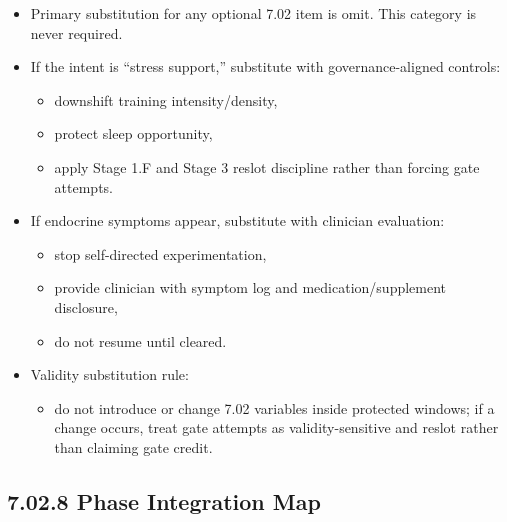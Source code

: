 \documentclass[10pt]{article}
\begin{document}
\begin{itemize}
\item Primary substitution for any optional 7.02 item is omit. This category is never required.
\item If the intent is “stress support,” substitute with governance-aligned controls:
  \begin{itemize}
  \item downshift training intensity/density,
  \item protect sleep opportunity,
  \item apply Stage 1.F and Stage 3 reslot discipline rather than forcing gate attempts.
  \end{itemize}
\item If endocrine symptoms appear, substitute with clinician evaluation:
  \begin{itemize}
  \item stop self-directed experimentation,
  \item provide clinician with symptom log and medication/supplement disclosure,
  \item do not resume until cleared.
  \end{itemize}
\item Validity substitution rule:
  \begin{itemize}
  \item do not introduce or change 7.02 variables inside protected windows; if a change occurs, treat gate attempts as validity-sensitive and reslot rather than claiming gate credit.
  \end{itemize}
\end{itemize}

\subsection*{7.02.8 Phase Integration Map}
{}

\begingroup
\scriptsize
\setlength{\tabcolsep}{2pt}
\renewcommand{\arraystretch}{1.12}
\end{document}
